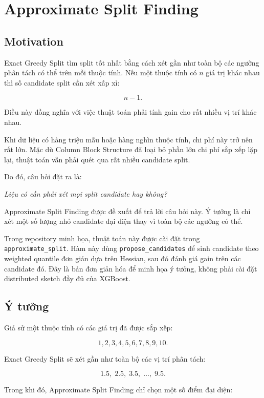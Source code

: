 \section{Approximate Split Finding}

\subsection{Motivation}

Exact Greedy Split tìm split tốt nhất bằng cách xét gần như toàn bộ các ngưỡng phân tách có thể trên mỗi thuộc tính. Nếu một thuộc tính có $n$ giá trị khác nhau thì số candidate split cần xét xấp xỉ:

\[
n - 1.
\]

Điều này đồng nghĩa với việc thuật toán phải tính gain cho rất nhiều vị trí khác nhau.

Khi dữ liệu có hàng triệu mẫu hoặc hàng nghìn thuộc tính, chi phí này trở nên rất lớn. Mặc dù Column Block Structure đã loại bỏ phần lớn chi phí sắp xếp lặp lại, thuật toán vẫn phải quét qua rất nhiều candidate split.

Do đó, câu hỏi đặt ra là:

\begin{center}
\textit{Liệu có cần phải xét mọi split candidate hay không?}
\end{center}

Approximate Split Finding được đề xuất để trả lời câu hỏi này. Ý tưởng là chỉ xét một số lượng nhỏ candidate đại diện thay vì toàn bộ các ngưỡng có thể.

Trong repository minh họa, thuật toán này được cài đặt trong \texttt{approximate\_split}. Hàm này dùng \texttt{propose\_candidates} để sinh candidate theo weighted quantile đơn giản dựa trên Hessian, sau đó đánh giá gain trên các candidate đó. Đây là bản đơn giản hóa để minh họa ý tưởng, không phải cài đặt distributed sketch đầy đủ của XGBoost.

\subsection{Ý tưởng}

Giả sử một thuộc tính có các giá trị đã được sắp xếp:

\[
1,2,3,4,5,6,7,8,9,10.
\]

Exact Greedy Split sẽ xét gần như toàn bộ các vị trí phân tách:

\[
1.5,\;2.5,\;3.5,\;\ldots,\;9.5.
\]

Trong khi đó, Approximate Split Finding chỉ chọn một số điểm đại diện:

